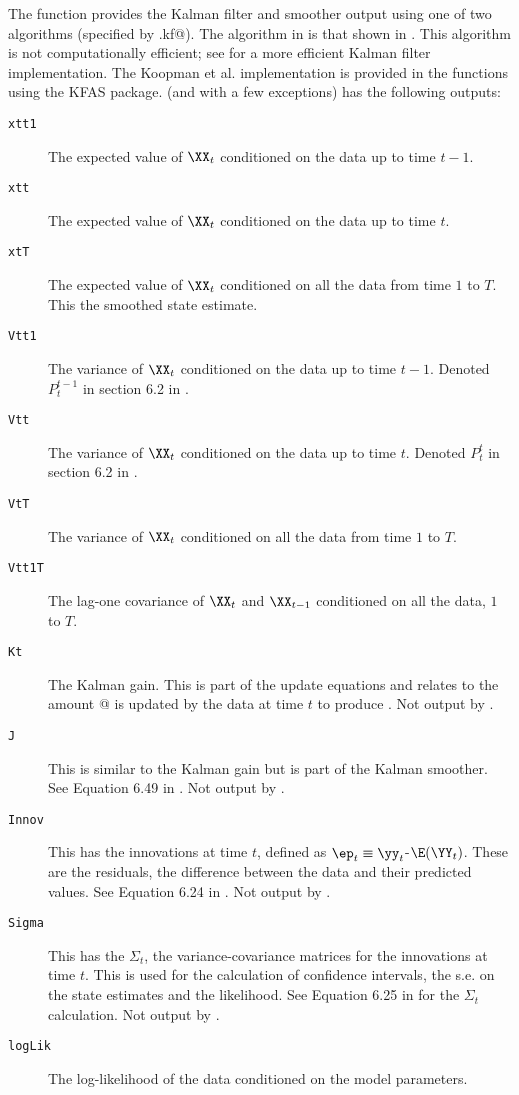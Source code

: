 The \verb@MARSSkf@{} function provides the Kalman filter and smoother output using one of two algorithms (specified by \verb@fun.kf@).  The algorithm in 
\verb@MARSSkfss@ is that shown in \citet{ShumwayStoffer2006}.  This algorithm is not computationally efficient; see \citet[sec. 4.3]{Koopmanetal1998} for a more efficient Kalman filter implementation. The Koopman et al. implementation is provided in the functions \verb@MARSSkfas@ using the KFAS \R package.  \verb@MARSSkfss@ (and \verb@MARSSkfas@ with a few exceptions) has the following outputs:
\begin{description}
\item[\texttt{xtt1 }] The expected value of $\XX_t$ conditioned on the data up to time $t-1$.
\item[\texttt{xtt  }] The expected value of $\XX_t$ conditioned on the data up to time $t$.
\item[\texttt{xtT  }] The expected value of $\XX_t$ conditioned on all the data from time $1$ to $T$.  This the smoothed state estimate.
\item[\texttt{Vtt1 }] The variance of $\XX_t$ conditioned on the data up to time $t-1$.  Denoted $P_t^{t-1}$ in section 6.2 in \citet{ShumwayStoffer2006}.
\item[\texttt{Vtt  }] The variance of $\XX_t$ conditioned on the data up to time $t$. Denoted $P_t^t$ in section 6.2 in \citet{ShumwayStoffer2006}.
\item[\texttt{VtT  }] The variance of $\XX_t$ conditioned on all the data from time $1$ to $T$.
\item[\texttt{Vtt1T}] The lag-one covariance of $\XX_t$ and $\XX_{t-1}$ conditioned on all the data, $1$ to $T$.
\item[\texttt{Kt   }] The Kalman gain.  This is part of the update equations and relates to the amount @ is updated by the data at time $t$ to produce \verb@xtt@.    Not  output by \verb@MARSSkfas@.
\item[\texttt{J    }] This is similar to the Kalman gain but is part of the Kalman smoother.  See Equation 6.49 in \citet{ShumwayStoffer2006}.     Not  output by \verb@MARSSkfas@.
\item[\texttt{Innov}] This has the innovations at time $t$, defined as $\ep_t \equiv \yy_t$-$\E(\YY_t)$.  These are the residuals, the difference between the data and their predicted values.  See Equation 6.24 in \citet{ShumwayStoffer2006}. Not  output by \verb@MARSSkfas@.
\item[\texttt{Sigma}] This has the $\Sigma_t$, the variance-covariance matrices for the innovations at time $t$.  This is used for the calculation of confidence intervals, the s.e. on the state estimates and the likelihood.  See Equation 6.25 in \citet{ShumwayStoffer2006} for the $\Sigma_t$ calculation.  Not  output by \verb@MARSSkfas@.
\item[\texttt{logLik}] The log-likelihood of the data conditioned on the model parameters.  
\end{description}

